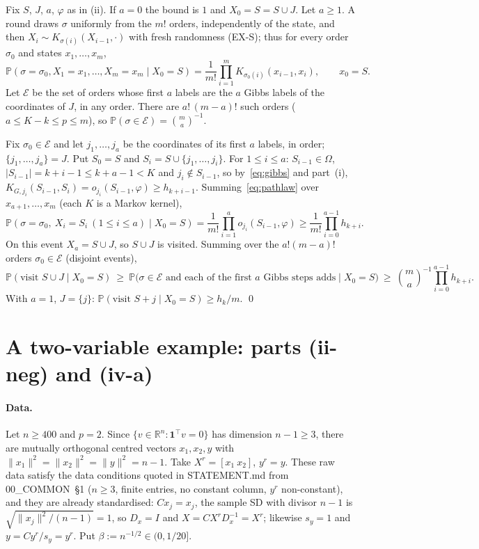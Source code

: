 \documentclass[11pt]{article}
\theoremstyle{definition}
\newcommand{\Om}{\Omega}
\renewcommand{\Pr}{\mathbb P}
\newcommand{\ph}{\varphi}
\newcommand{\one}{\mathbf 1}
\begin{document}
Fix $S$, $J$, $a$, $\ph$ as in (ii). If $a=0$ the bound is $1$ and $X_0=S=S\cup J$. Let $a\ge1$. A round draws $\sigma$ uniformly from the $m!$ orders, independently of the state, and then $X_i\sim K_{\sigma(i)}(X_{i-1},\cdot)$ with fresh randomness (EX-S); thus for every order $\sigma_0$ and states $x_1,\dots,x_m$,
\begin{equation}\label{eq:pathlaw}
\Pr(\sigma=\sigma_0,X_1=x_1,\dots,X_m=x_m\mid X_0=S)=\frac1{m!}\prod_{i=1}^mK_{\sigma_0(i)}(x_{i-1},x_i),\qquad x_0=S.
\end{equation}
Let $\mathcal E$ be the set of orders whose first $a$ labels are the $a$ Gibbs labels of the coordinates of $J$, in any order. There are $a!\,(m-a)!$ such orders ($a\le K-k\le p\le m$), so $\Pr(\sigma\in\mathcal E)=\binom ma^{-1}$.

Fix $\sigma_0\in\mathcal E$ and let $j_1,\dots,j_a$ be the coordinates of its first $a$ labels, in order; $\{j_1,\dots,j_a\}=J$. Put $S_0=S$ and $S_i=S\cup\{j_1,\dots,j_i\}$. For $1\le i\le a$: $S_{i-1}\in\Om$, $|S_{i-1}|=k+i-1\le k+a-1<K$ and $j_i\notin S_{i-1}$, so by~\eqref{eq:gibbs} and part~(i),
$K_{G,j_i}(S_{i-1},S_i)=o_{j_i}(S_{i-1},\ph)\ge h_{k+i-1}$. Summing~\eqref{eq:pathlaw} over $x_{a+1},\dots,x_m$ (each $K$ is a Markov kernel),
\[
\Pr(\sigma=\sigma_0,\ X_i=S_i\ (1\le i\le a)\mid X_0=S)=\frac1{m!}\prod_{i=1}^a o_{j_i}(S_{i-1},\ph)\ge\frac1{m!}\prod_{i=0}^{a-1}h_{k+i}.
\]
On this event $X_a=S\cup J$, so $S\cup J$ is visited. Summing over the $a!(m-a)!$ orders $\sigma_0\in\mathcal E$ (disjoint events),
\[
\Pr(\text{visit }S\cup J\mid X_0=S)\ \ge\ \Pr\big(\sigma\in\mathcal E\text{ and each of the first $a$ Gibbs steps adds}\mid X_0=S\big)\ \ge\ \binom ma^{-1}\prod_{i=0}^{a-1}h_{k+i}.
\]
With $a=1$, $J=\{j\}$: $\Pr(\text{visit }S+j\mid X_0=S)\ge h_k/m$. \qed

\section{A two-variable example: parts (ii-neg) and (iv-a)}\label{sec:ex}

\paragraph{Data.} Let $n\ge400$ and $p=2$. Since $\{v\in\mathbb R^n:\one^\top v=0\}$ has dimension $n-1\ge3$, there are mutually orthogonal centred vectors $x_1,x_2,y$ with $\|x_1\|^2=\|x_2\|^2=\|y\|^2=n-1$. Take $X^r=[x_1\ x_2]$, $y^r=y$. These raw data satisfy the data conditions quoted in STATEMENT.md from 00\_COMMON~\S1 ($n\ge3$, finite entries, no constant column, $y^r$ non-constant), and they are already standardised: $Cx_j=x_j$, the sample SD with divisor $n-1$ is $\sqrt{\|x_j\|^2/(n-1)}=1$, so $D_x=I$ and $X=CX^rD_x^{-1}=X^r$; likewise $s_y=1$ and $y=Cy^r/s_y=y^r$. Put $\beta:=n^{-1/2}\in(0,1/20]$.
\end{document}
